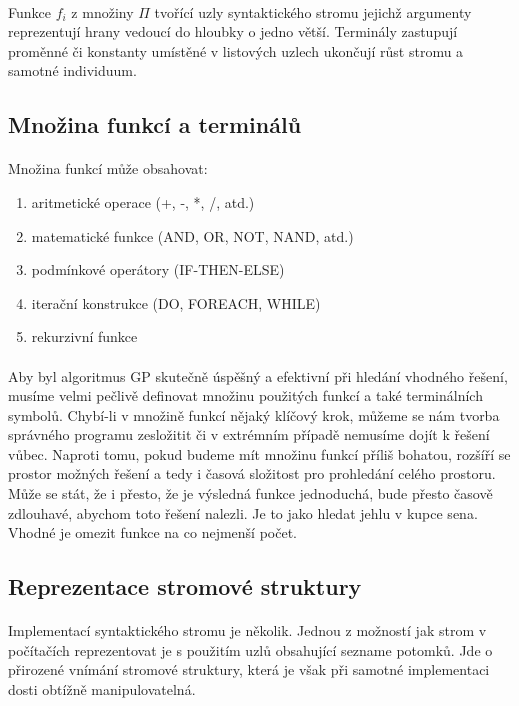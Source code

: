 \documentclass[bc,male,java,dept460]{diploma}		%
\begin{document}
\paragraph*{}
Funkce $f_i$ z množiny $\Pi$ tvořící uzly syntaktického stromu jejichž argumenty reprezentují hrany vedoucí do hloubky o jedno větší. Terminály zastupují proměnné či konstanty umístěné v listových uzlech ukončují růst stromu a samotné individuum.

\subsection{Množina funkcí a terminálů}
\paragraph*{}
Množina funkcí může obsahovat:
\begin{enumerate}
\item aritmetické operace (+, -, *, /, atd.)
\item matematické funkce (AND, OR, NOT, NAND, atd.)
\item podmínkové operátory (IF-THEN-ELSE)
\item iterační konstrukce (DO, FOREACH, WHILE)
\item rekurzivní funkce
\end{enumerate}

\paragraph*{}
Aby byl algoritmus GP skutečně úspěšný a efektivní při hledání vhodného řešení, musíme velmi pečlivě definovat množinu použitých funkcí a také terminálních symbolů. Chybí-li v množině funkcí nějaký klíčový krok, můžeme se nám tvorba správného programu zesložitit či v extrémním případě nemusíme dojít k řešení vůbec. Naproti tomu, pokud budeme mít množinu funkcí příliš bohatou, rozšíří se prostor možných řešení a tedy i časová složitost pro prohledání celého prostoru. Může se stát, že i přesto, že je výsledná funkce jednoduchá, bude přesto časově zdlouhavé, abychom toto řešení nalezli. Je to jako hledat jehlu v kupce sena. Vhodné je omezit funkce na co nejmenší počet.

\subsection{Reprezentace stromové struktury}
\paragraph*{}
Implementací syntaktického stromu je několik. Jednou z možností jak strom v počítačích reprezentovat je s použitím uzlů obsahující sezname potomků. Jde o přirozené vnímání stromové struktury, která je však při samotné implementaci dosti obtížně manipulovatelná. 
\end{document}
